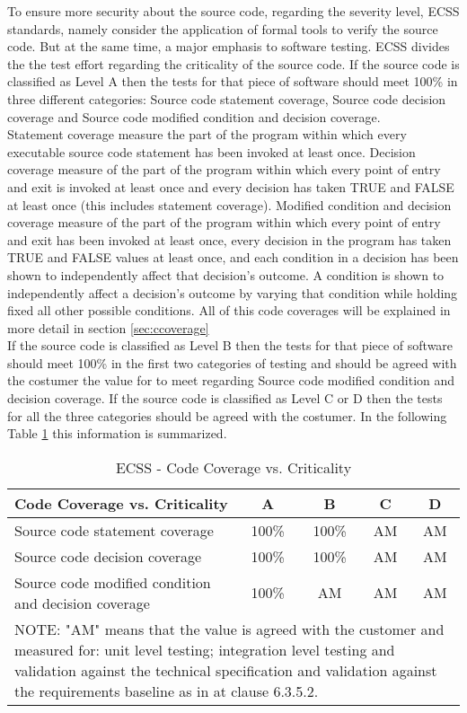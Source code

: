 To ensure more security about the source code, regarding the severity level, \ac{ECSS} standards, namely \cite{ecss-q-st-40c}
consider the application of formal tools to verify the source code. But at the same time, a major emphasis to software testing.
\ac{ECSS} divides the the test effort regarding the criticality of the source code.
If the source code is classified as Level A then the tests for that piece of software should meet 100\% in
three different categories: Source code statement coverage, Source code decision coverage and Source code modified condition and decision coverage.\\
Statement coverage measure the part of the program within which every executable source code statement has been invoked at least once.
Decision coverage measure of the part of the program within which every point of entry and exit
is invoked at least once and every decision has taken TRUE and FALSE
at least once (this includes statement coverage).
Modified condition and decision coverage measure of the part of the program within which every point of entry and exit
has been invoked at least once, every decision in the program has taken TRUE and FALSE values at least once, and each condition in a decision has been
shown to independently affect that decision's outcome. A condition is shown to independently affect a
decision's outcome by varying that condition while holding fixed all other possible conditions. All of this code coverages will be explained in more detail in section
\ref{sec:ccoverage}\\
If the source code is classified as Level B then the tests for that piece of software should meet 100\% in the first two categories of testing and should be
agreed with the costumer the value for to meet regarding Source code modified condition and decision coverage.
If the source code is classified as Level C or D then the tests for all the three categories should be agreed with the costumer.
In the following Table \ref{tab:ccoverage} this information is summarized.

\begin{table}[!ht]
\centering
\noindent \begin{tabular}{|m{6cm}|c|c|c|c|}
\hline
\textbf{Code Coverage vs. Criticality} & A & B & C & D \\\hline
Source code statement coverage & 100\% & 100\% & AM & AM \\\hline
Source code decision coverage & 100\% & 100\% & AM & AM \\\hline
Source code modified condition and decision coverage & 100\% & AM & AM & AM \\\hline
\multicolumn{5}{|m{14cm}|}{
NOTE: "AM" means that the value is agreed with the customer and measured for:
unit level testing; integration level testing and validation against the
technical specification and validation against the requirements baseline
as in \cite{ecss-q-st-80c} at clause 6.3.5.2.
}\\\hline
\end{tabular}
\caption{\protect\ac{ECSS} - Code Coverage vs. Criticality}\label{tab:ccoverage}
\end{table}

